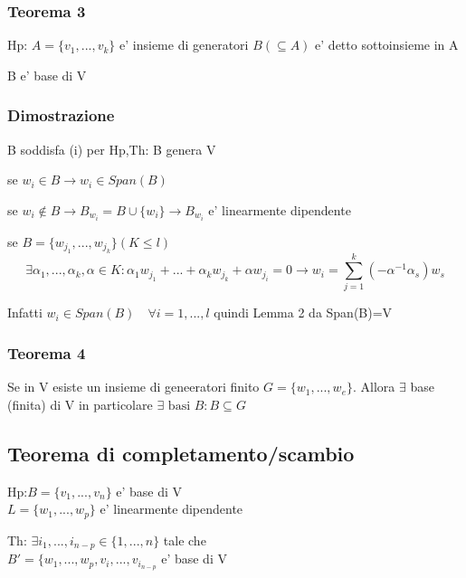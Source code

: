 \documentclass{article}
\begin{document}
\subsubsection*{Teorema 3}
\begin{flushleft}
	Hp: $A=\{v_1,...,v_k \} $ e' insieme di generatori $B (\subseteq A)$ e' detto sottoinsieme in A
\end{flushleft}
\begin{flushleft}
	B e' base di V
\end{flushleft}
\subsubsection*{Dimostrazione}
\begin{flushleft}
	B soddisfa (i) per Hp,Th: B genera V
\end{flushleft}
\begin{flushleft}
	se $w_i \in B \to w_i \in Span(B)$
\end{flushleft}
\begin{flushleft}
	se $w_i \notin B \to B_{w_i} = B \cup \{ w_i \} \to B_{w_i}$ e' linearmente dipendente
\end{flushleft}
se $B=\{w_{j_1},...,w_{j_k} \} (K \leq l)$
\begin{equation*}
	\exists \alpha_1,...,\alpha_k, \alpha \in K: \alpha_1 w_{j_1}+...+\alpha_k w_{j_k}+\alpha w_{j_i} =0 \to w_i = \sum_{j=1}^k (-\alpha^{-1}\alpha_s)w_s
\end{equation*}
\begin{flushleft}
	Infatti $w_i \in Span(B) \quad \forall i=1,...,l$ quindi Lemma 2 da Span(B)=V
\end{flushleft}
\subsubsection*{Teorema 4}
\begin{flushleft}
	Se in V esiste un insieme di geneeratori finito $G=\{ w_1,...,w_e \}$. Allora $\exists$ base (finita) di V in particolare $\exists \text{ basi } B : B\subseteq G$
\end{flushleft}
\subsection*{Teorema di completamento/scambio}
\begin{flushleft}
	Hp:$B= \{ v_1,...,v_n \}$ e' base di V\\
	$L= \{ w_1,...,w_p \}$ e' linearmente dipendente
\end{flushleft}
\begin{flushleft}
	Th: $\exists i_1,...,i_{n-p}\in \{ 1,...,n \}$ tale che \\
	$B'=\{ w_1,...,w_p,v_i,...,v_{i_{n-p}}$ e' base di V
\end{flushleft}
\end{document}
